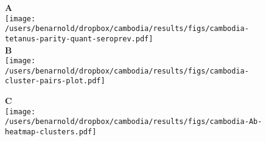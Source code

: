 \documentclass[10pt]{article}
\title{}
\author{}
\date{}
\begin{document}





\begin{figure}[htbp]
\begin{flushleft}

{\Large \textbf{A}} \\
\vspace{-10pt}
\texttt{[image: /users/benarnold/dropbox/cambodia/results/figs/cambodia-tetanus-parity-quant-seroprev.pdf]} \\

\vspace{5pt}
{\Large \textbf{B}} \\
\vspace{-25pt}
\texttt{[image: /users/benarnold/dropbox/cambodia/results/figs/cambodia-cluster-pairs-plot.pdf]} \\
\vspace{-5pt}

{\Large \textbf{C}} \\ 
\vspace{-15pt}
\texttt{[image: /users/benarnold/dropbox/cambodia/results/figs/cambodia-Ab-heatmap-clusters.pdf]} \\

\begin{minipage}{\textwidth}
\caption{}
\label{fig:tetpairsheat}
\end{minipage}
\end{flushleft}
\end{figure}
\end{document}
